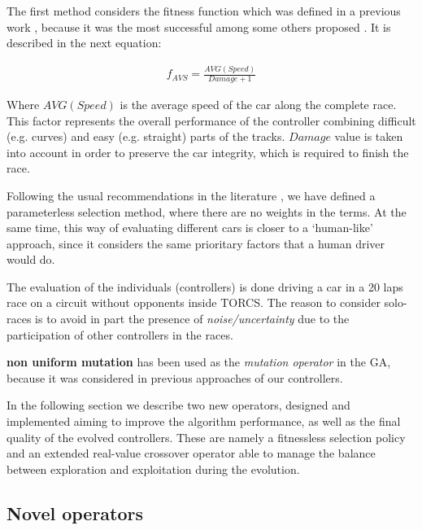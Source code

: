 \documentclass[10pt,journal,compsoc]{IEEEtran}
\begin{document}
The first method considers the fitness function which was defined in a previous work \cite{salem_cig2018}, because it was the most successful among some others proposed \cite{salem_evo18}. It is described in the next equation:

 \begin{equation} \label{fit_avg}
 	\begin{array}{lll}
 		f_{AVS}= \frac{AVG(Speed)}{Damage+1}
 	\end{array}
 \end{equation}	

Where $AVG(Speed)$ is the average speed of the car along the complete race. This factor represents the overall performance of the controller combining difficult (e.g. curves) and easy (e.g. straight) parts of the tracks. $Damage$ value is taken into account in order to preserve the car integrity, which is required to finish the race.

Following the usual recommendations in the literature
\cite{Harik-ParameterLess99}, we have defined a parameterless
selection method, where there are no weights in the terms.
At the same time, this way of evaluating different cars is closer to a `human-like'
approach, since it considers the same prioritary factors that a human
driver would do. 

The evaluation of the individuals (controllers) is done driving a car
in a 20 laps race on a circuit without opponents inside TORCS. The
reason to consider solo-races is to avoid in part the presence of
\textit{noise/uncertainty} due to the participation of other
controllers \cite{merelo2016statistical} in the races. 

\textbf{non uniform mutation} \cite{mutation1997} has been used as the \textit{mutation operator} in the GA, because it was considered in previous approaches of our controllers. 

In the following section we describe two new operators, designed and implemented aiming to improve the algorithm performance, as well as the final quality of the evolved controllers. These are namely a fitnessless selection policy and an extended real-value crossover operator able to manage the balance between exploration and exploitation during the evolution.

\subsection{Novel operators}
\label{subsec:novel_operators}
\end{document}
